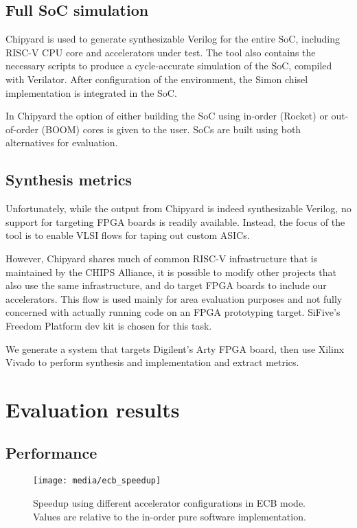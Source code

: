 \documentclass[10pt,conference]{IEEEtran}
\begin{document}
\subsection{Full SoC simulation}

Chipyard is used to generate synthesizable Verilog for the
entire SoC, including RISC-V CPU core and accelerators under test. The tool also
contains the necessary scripts to produce a cycle-accurate simulation of the
SoC, compiled with Verilator. After configuration of the environment, the Simon
chisel implementation is integrated in the SoC.

In Chipyard the option of either building the SoC using in-order (Rocket) or
out-of-order (BOOM) cores is given to the user. SoCs are built using both
alternatives for evaluation.

\subsection{Synthesis metrics}

Unfortunately, while the output from Chipyard is indeed synthesizable Verilog,
no support for targeting FPGA boards is readily available. Instead, the focus of
the tool is to enable VLSI flows for taping out custom ASICs.

However, Chipyard shares much of common RISC-V infrastructure that is maintained
by the CHIPS Alliance, it is possible to modify other projects that also use the
same infrastructure, and do target FPGA boards to include our accelerators. This
flow is used mainly for area evaluation purposes and not fully concerned with
actually running code on an FPGA prototyping target. SiFive's Freedom Platform
dev kit is chosen for this task.

We generate a system that targets Digilent's Arty FPGA board, then use Xilinx
Vivado to perform synthesis and implementation and extract metrics.

\section{Evaluation results}

\subsection{Performance}

\begin{figure}
  \centering
  \texttt{[image: media/ecb\_speedup]}
  \caption{Speedup using different accelerator configurations in ECB mode.
    Values are relative to the in-order pure software implementation.}
  \label{fig:ecbspeedup}
\end{figure}
\end{document}

